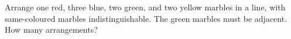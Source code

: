 Arrange one red, three blue, two green, and two yellow marbles in a line, with same-coloured marbles indistinguishable. The green marbles must be adjacent. How many arrangements?
